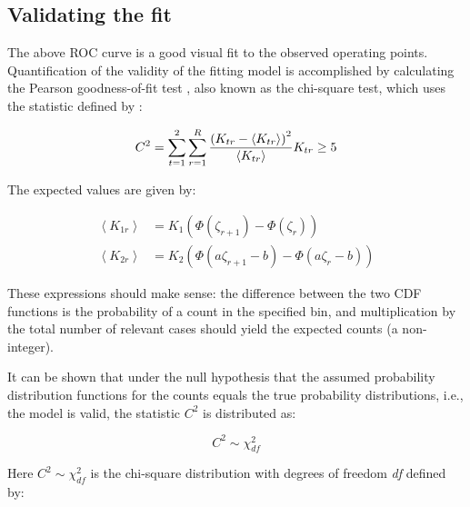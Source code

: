 \documentclass[
]{book}
\begin{document}
\hypertarget{binormal-model-curve-fitting-validation}{%
\subsection{Validating the fit}\label{binormal-model-curve-fitting-validation}}

The above ROC curve is a good visual fit to the observed operating points. Quantification of the validity of the fitting model is accomplished by calculating the Pearson goodness-of-fit test \citep{RN2656}, also known as the chi-square test, which uses the statistic defined by \citep{RN1492}:

\begin{equation} 
C^2=\sum_{t=1}^{2}\sum_{r=1}^{R}\frac{\left (K_{tr}-\left \langle K_{tr} \right \rangle  \right )^2}{\left \langle K_{tr} \right \rangle}\\
K_{tr} \geq 5
\label{eq:binormal-modelGoodnessFit}
\end{equation}

The expected values are given by:

\begin{equation}
\begin{split}
\left \langle K_{1r} \right \rangle &=K_1\left ( \Phi\left ( \zeta_{r+1} \right ) - \Phi\left ( \zeta_r \right )  \right ) \\
\left \langle K_{2r} \right \rangle &=K_2\left ( \Phi\left ( a\zeta_{r+1}-b \right ) - \Phi\left ( a\zeta_r - b\right )  \right )
\end{split}
\label{eq:binormal-modelGoodnessFitExpVals}
\end{equation}

These expressions should make sense: the difference between the two CDF functions is the probability of a count in the specified bin, and multiplication by the total number of relevant cases should yield the expected counts (a non-integer).

It can be shown that under the null hypothesis that the assumed probability distribution functions for the counts equals the true probability distributions, i.e., the model is valid, the statistic \(C^2\) is distributed as:

\begin{equation} 
C^2\sim \chi_{df}^{2}
\label{eq:binormal-modelGoodnessFitDistr}
\end{equation}

Here \(C^2\sim \chi_{df}^{2}\) is the chi-square distribution with degrees of freedom \emph{df} defined by:
\end{document}

